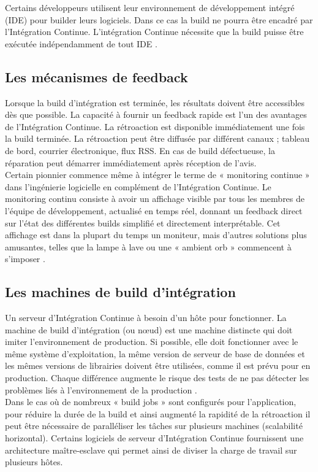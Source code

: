 \documentclass{report}
\begin{document}
      Certains développeurs utilisent leur environnement de développement intégré (IDE) pour builder leurs logiciels. Dans ce cas la build ne pourra être encadré par l’Intégration Continue. L’intégration Continue nécessite que la build puisse être exécutée indépendamment de tout IDE \cite{Duv07}.


      \subsection{Les mécanismes de feedback}
      Lorsque la build d'intégration est terminée, les résultats doivent être accessibles dès que possible. La capacité à fournir un feedback rapide est l'un des avantages de l’Intégration Continue. La rétroaction est disponible immédiatement une fois la build terminée. La rétroaction peut être diffusée par différent canaux ; tableau de bord, courrier électronique, flux RSS. En cas de build défectueuse, la réparation peut démarrer immédiatement après réception de l'avis.\\

      Certain pionnier commence même à intégrer le terme de « monitoring continue » dans l’ingénierie logicielle en complément de l’Intégration Continue. Le monitoring continu consiste à avoir un affichage visible par tous les membres de l’équipe de développement, actualisé en temps réel, donnant un feedback direct sur l’état des différentes builds simplifié et directement interprétable. Cet affichage est dans la plupart du temps un moniteur, mais d’autres solutions plus amusantes, telles que la lampe à lave ou une « ambient orb » commencent à s’imposer \cite{Swa04}.


      \subsection{Les machines de build d’intégration}
      Un serveur d’Intégration Continue à besoin d'un hôte pour fonctionner. La machine de build d’intégration (ou nœud)  est une machine distincte qui doit imiter l'environnement de production. Si possible, elle doit fonctionner avec le même système d'exploitation, la même version de serveur de base de données et les mêmes versions de librairies doivent être utilisées, comme il est prévu pour en production. Chaque différence augmente le risque des tests de ne pas détecter les problèmes liés à l’environnement de la production \cite{Fow06}.\\

      Dans le cas où de nombreux « build jobs » sont configurés pour l’application, pour réduire la durée de la build et ainsi augmenté la rapidité de la rétroaction il peut être nécessaire de paralléliser les tâches sur plusieurs machines (scalabilité horizontal). Certains logiciels de serveur d’Intégration Continue fournissent une architecture maître-esclave qui permet ainsi de diviser la charge de travail sur plusieurs hôtes.\\
\end{document}
